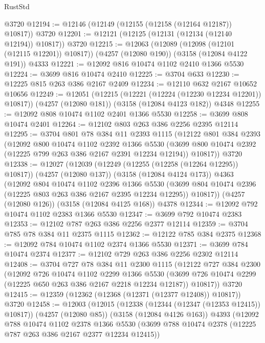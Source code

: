 \begin{lexlean}{RustStd}
\begin{coremodule}
{\begin{coremodule}
{{{{{{{{{{{{{{{{{{{{{{{{{{    @3720
@12194 := @12146 (@12149 (@12155 (@12158 (@12164 @12187)) @10817)) @3720
@12201 := @12121 (@12125 (@12131 (@12134 (@12140 @12194)) @10817)) @3720
@12215 := @12063
    (@12089 (@12098 (@12101 (@12115 @12201)) @10817))
    (@4257 (@12080 @190))
    (@3158 (@12084 @4122 @191))
    @4333
@12221 := @12092 @816 @10474 @1102 @2410 @1366 @5530
@12224 := @3699 @816 @10474 @2410
@12225 := @3704 @633
@12230 := @12225 @815 @263 @386 @2167 @2409
@12234 := @12110 @632 @2167 @10652 @10656
@12249 := @12051
    (@12215 (@12221 (@12224 (@12230 @12234 @12201)) @10817))
    (@4257 (@12080 @181))
    (@3158 (@12084 @4123 @182))
    @4348
@12255 := @12092 @808 @10474 @1102 @2401 @1366 @5530
@12258 := @3699 @808 @10474 @2401
@12264 := @12102 @803 @263 @386 @2256 @2395 @12114
@12295 := @3704
    @801
    @78
    @384
    @11
    @2393
    @1115
    (@12122
      @801
      @384
      @2393
      (@12092
        @800
        @10474
        @1102
        @2392
        @1366
        @5530
        (@3699 @800 @10474 @2392 (@12225 @799 @263 @386 @2167 @2391 @12234 @12194))
        @10817))
    @3720
@12338 := @12027
    (@12039
      (@12249 (@12255 (@12258 (@12264 @12295)) @10817))
      (@4257 (@12080 @137))
      (@3158 (@12084 @4124 @173))
      @4363
      (@12092
        @804
        @10474
        @1102
        @2396
        @1366
        @5530
        (@3699 @804 @10474 @2396 (@12225 @803 @263 @386 @2167 @2395 @12234 @12295))
        @10817))
    (@4257 (@12080 @126))
    (@3158 (@12084 @4125 @168))
    @4378
@12344 := @12092 @792 @10474 @1102 @2383 @1366 @5530
@12347 := @3699 @792 @10474 @2383
@12353 := @12102 @787 @263 @386 @2256 @2377 @12114
@12359 := @3704 @785 @78 @384 @11 @2375 @1115
@12362 := @12122 @785 @384 @2375
@12368 := @12092 @784 @10474 @1102 @2374 @1366 @5530
@12371 := @3699 @784 @10474 @2374
@12377 := @12102 @729 @263 @386 @2256 @2302 @12114
@12408 := @3704
    @727
    @78
    @384
    @11
    @2300
    @1115
    (@12122
      @727
      @384
      @2300
      (@12092
        @726
        @10474
        @1102
        @2299
        @1366
        @5530
        (@3699 @726 @10474 @2299 (@12225 @650 @263 @386 @2167 @2218 @12234 @12187))
        @10817))
    @3720
@12415 := @12359 (@12362 (@12368 (@12371 (@12377 @12408)) @10817)) @3720
@12458 := @12003
    (@12015
      (@12338 (@12344 (@12347 (@12353 @12415)) @10817))
      (@4257 (@12080 @85))
      (@3158 (@12084 @4126 @163))
      @4393
      (@12092
        @788
        @10474
        @1102
        @2378
        @1366
        @5530
        (@3699 @788 @10474 @2378 (@12225 @787 @263 @386 @2167 @2377 @12234 @12415))
}}}}}}}}}}}}}}}}}}}}}}}}}}
\end{coremodule}}
\end{coremodule}
\end{lexlean}
